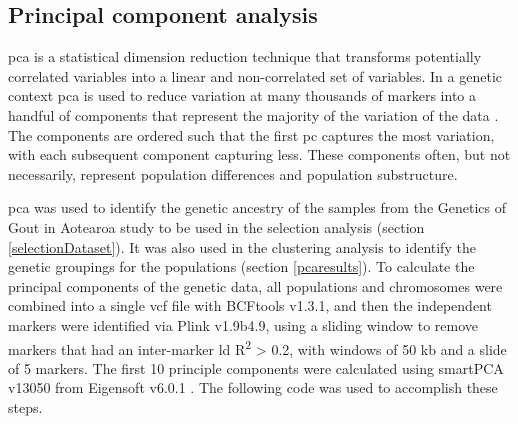 \documentclass[]{report}
\begin{document}
\subsection{Principal component analysis}\label{pca}

\Glsdesc{pca} is a statistical dimension reduction technique that
transforms potentially correlated variables into a linear and
non-correlated set of variables. In a genetic context \gls{pca} is used
to reduce variation at many thousands of markers into a handful of
components that represent the majority of the variation of the data
\citep{Patterson2006}. The components are ordered such that the first
\gls{pc} captures the most variation, with each subsequent component
capturing less. These components often, but not necessarily, represent
population differences and population substructure.

\gls{pca} was used to identify the genetic ancestry of the samples from
the Genetics of Gout in Aotearoa study to be used in the selection
analysis (section \ref{selectionDataset}). It was also used in the
clustering analysis to identify the genetic groupings for the
populations (section \ref{pcaresults}). To calculate the principal
components of the genetic data, all populations and chromosomes were
combined into a single \gls{vcf} file with BCFtools v1.3.1, and then the
independent markers were identified via Plink v1.9b4.9, using a sliding
window to remove markers that had an inter-marker \gls{ld}
R\textsuperscript{2} \textgreater{} 0.2, with windows of 50 kb and a
slide of 5 markers. The first 10 principle components were calculated
using smartPCA v13050 from Eigensoft v6.0.1 \citep{Price2006}. The
following code was used to accomplish these steps.
\end{document}

